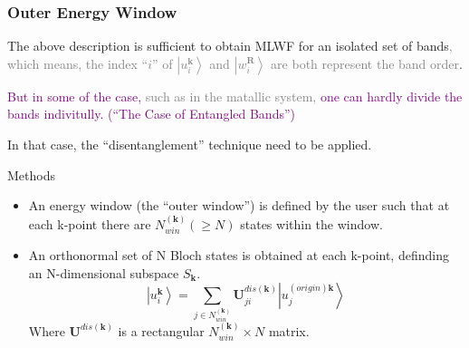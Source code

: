 \documentclass{beamer}
\begin{document}
  \begin{frame}
    \frametitle{Outer Energy Window}
    \small
    The above description is sufficient to obtain MLWF for an isolated set of bands\textcolor{gray}{, which means, the index ``\(i\)'' of \(\left|u_i^{\mathbf{k}}\right\rangle\) and \(\left|w_i^{\mathbf{R}}\right\rangle\) are both represent the band order}.

    \textcolor{purple}{But in some of the case, \textcolor{gray}{such as in the matallic system, } one can hardly divide the bands indivitully. (``The Case of Entangled Bands'')}
    
    In that case, the ``disentanglement'' technique need to be applied. 

    \begin{block}{Methods}
      \small
      \begin{itemize}
        \item An energy window (the ``outer window'') is defined by the user such that at each k-point there are \(N_{win}^{(\mathbf{k})} (\geqslant N)\) states within the window. 
        \item An orthonormal set of N Bloch states is obtained at each k-point, definding an N-dimensional subspace \(S_{\mathbf{k}}\).
        \begin{equation}
          \left|u_i^{\mathbf{k}}\right\rangle = \sum_{j\in{N_{win}^{(\mathbf{k})}}}\mathbf{U}_{ji}^{dis(\mathbf{k})}\left|u_j^{(origin)\mathbf{k}}\right\rangle
        \end{equation}
        Where \(\mathbf{U}^{dis(\mathbf{k})}\) is a rectangular \(N_{win}^{(\mathbf{k})}\times{}N\) matrix. 
      \end{itemize}
    \end{block}

  \end{frame}
\end{document}
